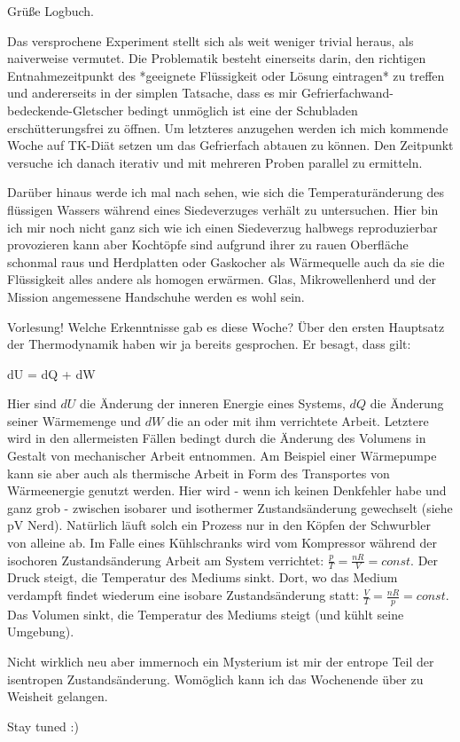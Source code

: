 Grüße Logbuch.

Das versprochene Experiment stellt sich als weit weniger trivial heraus, als naiverweise vermutet. Die Problematik
besteht einerseits darin, den richtigen Entnahmezeitpunkt des *geeignete Flüssigkeit oder Lösung eintragen* zu treffen und andererseits
in der simplen Tatsache, dass es mir Gefrierfachwand-bedeckende-Gletscher bedingt unmöglich ist eine der Schubladen
erschütterungsfrei zu öffnen. Um letzteres anzugehen werden ich mich kommende Woche auf TK-Diät setzen um das Gefrierfach
abtauen zu können. Den Zeitpunkt versuche ich danach iterativ und mit mehreren Proben parallel zu ermitteln.\par
Darüber hinaus werde ich mal nach sehen, wie sich die Temperaturänderung des flüssigen Wassers während eines Siedeverzuges
verhält zu untersuchen. Hier bin ich mir noch nicht ganz sich wie ich einen Siedeverzug halbwegs reproduzierbar provozieren
kann aber Kochtöpfe sind aufgrund ihrer zu rauen Oberfläche schonmal raus und Herdplatten oder Gaskocher als Wärmequelle
auch da sie die Flüssigkeit alles andere als homogen erwärmen. Glas, Mikrowellenherd und der Mission angemessene Handschuhe
werden es wohl sein.\par
Vorlesung! Welche Erkenntnisse gab es diese Woche? Über den ersten Hauptsatz der Thermodynamik haben wir ja bereits gesprochen.
Er besagt, dass gilt:

\be
dU = dQ + dW
\ee

Hier sind \(dU\) die Änderung der inneren Energie eines Systems, \(dQ\) die Änderung seiner Wärmemenge und \(dW\) die an oder
mit ihm verrichtete Arbeit. Letztere wird in den allermeisten Fällen bedingt durch die Änderung des Volumens in Gestalt von mechanischer
Arbeit entnommen. Am Beispiel einer Wärmepumpe kann sie aber auch als thermische Arbeit in Form des Transportes von Wärmeenergie genutzt werden.
Hier wird - wenn ich keinen Denkfehler habe und ganz grob - zwischen isobarer und isothermer Zustandsänderung gewechselt (siehe pV Nerd).
Natürlich läuft solch ein Prozess nur in den Köpfen der Schwurbler von alleine ab. Im Falle eines Kühlschranks wird vom Kompressor während der
isochoren Zustandsänderung Arbeit am System verrichtet: \(\frac{p}{T}=\frac{nR}{V}=const\). Der Druck steigt, die Temperatur des Mediums sinkt.
Dort, wo das Medium verdampft findet wiederum eine isobare Zustandsänderung statt: \(\frac{V}{T}=\frac{nR}{p}=const\). Das Volumen sinkt, die
Temperatur des Mediums steigt (und kühlt seine Umgebung).\par
Nicht wirklich neu aber immernoch ein Mysterium ist mir der entrope Teil der isentropen Zustandsänderung. Womöglich kann ich das Wochenende über
zu Weisheit gelangen.\par

\begin{center}
    Stay tuned :)
\end{center}
